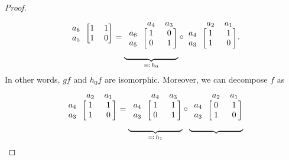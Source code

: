 \begin{proof}
\begin{equation}
\begin{blockarray}{c cc}
      \begin{block}{c [cc]}
        a_6 & 1 & 1 \\
        a_5 & 1 & 0 \\
      \end{block}
    \end{blockarray}
    =
    \underbrace{\begin{blockarray}{c cc}
      & a_4 & a_3 \\
      \begin{block}{c [cc]}
        a_6 & 1 & 0 \\
        a_5 & 0 & 1 \\
      \end{block}
    \end{blockarray}}_{\eqcolon \, h_0}
    \circ
    \begin{blockarray}{c cc}
      & a_2 & a_1 \\
      \begin{block}{c [cc]}
        a_4 & 1 & 1 \\
        a_3 & 1 & 0 \\
      \end{block}
    \end{blockarray}.
  \end{equation}
  In other words, $gf$ and $h_0f$ are isomorphic. Moreover, we can decompose $f$ as
  \[
    \begin{blockarray}{c cc}
      & a_2 & a_1 \\
      \begin{block}{c [cc]}
        a_4 & 1 & 1 \\
        a_3 & 1 & 0 \\
      \end{block}
    \end{blockarray}
    =
    \underbrace{\begin{blockarray}{c cc}
      & a_4 & a_3 \\
      \begin{block}{c [cc]}
        a_4 & 1 & 1 \\
        a_3 & 0 & 1 \\
      \end{block}
    \end{blockarray}}_{\eqcolon \, h_1}
    \circ
    \underbrace{\begin{blockarray}{c cc}
      & a_2 & a_1 \\
      \begin{block}{c [cc]}
        a_4 & 0 & 1 \\
        a_3 & 1 & 0 \\

\end{block}
\end{blockarray}}\]
\end{proof}
